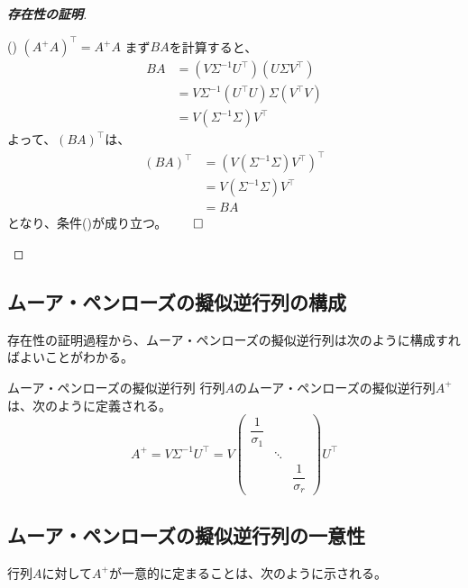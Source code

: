 \documentclass[../../../topic_linear-algebra]{subfiles}
\begin{document}
\begin{proof}[\bfseries 存在性の証明]
    \begin{subpattern}{() $(A^+A)^\top = A^+A$}
      まず$BA$を計算すると、
      \begin{align*}
        BA & = (V \Sigma^{-1} U^\top)(U \Sigma V^\top) \\
           & = V \Sigma^{-1} (U^\top U) \Sigma (V^\top V) \\
           & = V(\Sigma^{-1} \Sigma) V^\top
      \end{align*}
      よって、$(BA)^\top$は、
      \begin{align*}
        (BA)^\top & = (V(\Sigma^{-1} \Sigma) V^\top)^\top \\
                  & = V (\Sigma^{-1} \Sigma) V^\top \\
                  & = BA
      \end{align*}
      となり、条件()が成り立つ。$\qed$
    \end{subpattern}
\end{proof}

\subsection{ムーア・ペンローズの擬似逆行列の構成}

存在性の証明過程から、ムーア・ペンローズの擬似逆行列は次のように構成すればよいことがわかる。

\begin{definition*}{ムーア・ペンローズの擬似逆行列}
  行列$A$のムーア・ペンローズの擬似逆行列$A^+$は、次のように定義される。
  \begin{equation*}
    A^+ = V \Sigma^{-1} U^\top = V \begin{pmatrix}
                        \dfrac{1}{\sigma_1} &        &           \\
                                  & \ddots &           \\
                                  &        & \dfrac{1}{\sigma_r}
                      \end{pmatrix} U^\top
  \end{equation*}
\end{definition*}

\subsection{ムーア・ペンローズの擬似逆行列の一意性}

行列$A$に対して$A^+$が一意的に定まることは、次のように示される。
\end{document}
